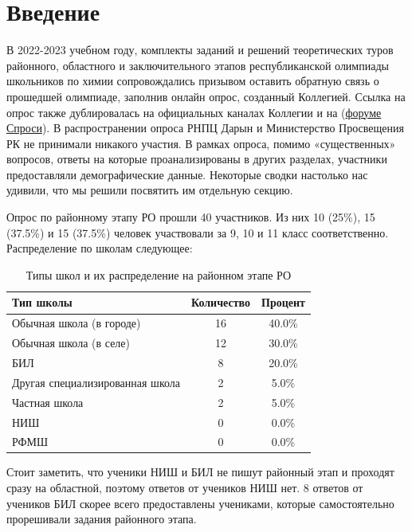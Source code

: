 \section{Введение}

В 2022-2023 учебном году, комплекты заданий и решений теоретических туров районного, областного и заключительного этапов республиканской олимпиады школьников по химии сопровождались призывом оставить обратную связь о прошедшей олимпиаде, заполнив онлайн опрос, созданный Коллегией. Ссылка на опрос также дублировалась на официальных каналах Коллегии и на (\href{https://ask.bc-pf.org}{форуме Спроси}). В распространении опроса РНПЦ Дарын и Министерство Просвещения РК не принимали никакого участия. В рамках опроса, помимо «существенных» вопросов, ответы на которые проанализированы в других разделах, участники предоставляли демографические данные. Некоторые сводки настолько нас удивили, что мы решили посвятить им отдельную секцию.

Опрос по районному этапу РО прошли 40 участников. Из них 10 (25\%), 15 (37.5\%) и 15 (37.5\%) человек участвовали за 9, 10 и 11 класс соответственно. Распределение по школам следующее:

\begin{table}[ht]
    \centering
    \begin{tabular}{|l|c|c|}
    \hline
    \textbf{Тип школы} & \textbf{Количество} & \textbf{Процент} \\ \hline
    Обычная школа (в городе) & 16 & 40.0\% \\ \hline
    Обычная школа (в селе) & 12 & 30.0\% \\ \hline
    БИЛ & 8 & 20.0\% \\ \hline
    Другая специализированная школа & 2 & 5.0\% \\ \hline
    Частная школа & 2 & 5.0\% \\ \hline
    НИШ & 0 & 0.0\% \\ \hline
    РФМШ & 0 & 0.0\% \\ \hline
    \end{tabular}
    \caption{Типы школ и их распределение на районном этапе РО}
    \label{tab:region-schols}
\end{table}

Стоит заметить, что ученики НИШ и БИЛ не пишут районный этап и проходят сразу на областной, поэтому ответов от учеников НИШ нет. 8 ответов от учеников БИЛ скорее всего предоставлены учениками, которые самостоятельно прорешивали задания районного этапа.

